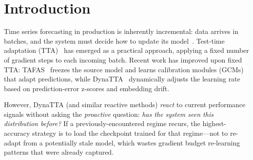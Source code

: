 \documentclass[journal]{IEEEtran}
\begin{document}
\begin{abstract}
Regime-guided policies achieve the lowest MSE in \textbf{156 of 224} seed-averaged experiments (\textbf{69.6\%}), with RG-EWC winning 30.4\% and RG-TTA winning 29.0\%. Overall, RG-TTA reduces MSE by 5.7\% vs TTA while running 5.5\% faster; RG-EWC reduces MSE by 14.1\% vs standalone EWC. Against full retraining (672 additional experiments, 3 architectures excluding DLinear), RG policies achieve a median 27\% MSE reduction while running 15--30$\times$ faster, winning 71\% of seed-averaged configurations. The regime-guidance layer composes naturally with existing TTA methods, improving accuracy without modifying the underlying forecaster.

\end{abstract}

\section{Introduction}
\label{sec:intro}

Time series forecasting in production is inherently incremental: data arrives in batches, and the system must decide how to update its model~\cite{lim2021timeseries,benidis2023deep}. Test-time adaptation (TTA)~\cite{liang2024tta} has emerged as a practical approach, applying a fixed number of gradient steps to each incoming batch. Recent work has improved upon fixed TTA: TAFAS~\cite{kim2025tafas} freezes the source model and learns calibration modules (GCMs) that adapt predictions, while DynaTTA~\cite{grover2025dynatta} dynamically adjusts the learning rate based on prediction-error z-scores and embedding drift.

However, DynaTTA (and similar reactive methods) \emph{react} to current performance signals without asking the \emph{proactive} question: \textit{has the system seen this distribution before?} If a previously-encountered regime recurs, the highest-accuracy strategy is to load the checkpoint trained for that regime---not to re-adapt from a potentially stale model, which wastes gradient budget re-learning patterns that were already captured.
\end{document}
